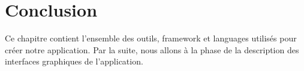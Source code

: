 


\section*{Conclusion }
Ce chapitre contient l'ensemble des outils, framework et languages utilisés pour créer notre application.
Par la suite, nous allons à la phase de la description des interfaces graphiques de l'application. 